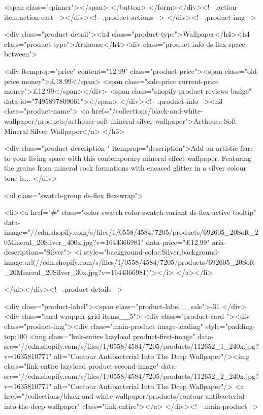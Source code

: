 {{{{{{{              <span class="spinner"></span>
            </button>
          </form></div><!-- .action-item.action-cart --></div><!-- .product-actions -->
</div><!-- .product-img -->

<div class="product-detail"><h4 class="product-type">Wallpaper</h4><h4 class="product-type">Arthouse</h4><div class="product-info ds-flex space-between">
    
<div itemprop="price" content="12.99" class="product-price"><span class="old-price money">£18.99</span>
    <span class="sale-price current-price money">£12.99</span></div>
    <span class="shopify-product-reviews-badge" data-id="7495897809061"></span>
  </div><!-- .product-info --><h3 class="product-name">
      <a href="/collections/black-and-white-wallpaper/products/arthouse-soft-mineral-silver-wallpaper">Arthouse Soft Mineral Silver Wallpaper</a>
    </h3>
    
<div class="product-description " itemprop="description">Add an artistic flare to your living space with this contemporary mineral effect wallpaper. Featuring the grains from mineral rock formations with encased glitter in a silver colour tone is...
</div>



<ul class="swatch-group ds-flex flex-wrap">
        
<li><a href="#" class="color-swatch color-swatch-variant ds-flex active tooltip" data-image="//cdn.shopify.com/s/files/1/0558/4584/7205/products/692605_20Soft_20Mineral_20Silver_400x.jpg?v=1644366981" data-price="£12.99" aria-description="Silver">
              <i style="background-color:Silver;background-image:url(//cdn.shopify.com/s/files/1/0558/4584/7205/products/692605_20Soft_20Mineral_20Silver_30x.jpg?v=1644366981)"></i>
            </a></li>

      </ul></div><!-- .product-details -->

<div class="product-label"><span class="product-label__sale">-31%
          </div><div class="card-wrapper grid-items__5">
            <div class="product-card "><div class="product-img"><div class="main-product image-loading" style="padding-top:100%
      <img class="link-entire lazyload product-first-image" data-src="//cdn.shopify.com/s/files/1/0558/4584/7205/products/112652_1_240x.jpg?v=1635810771" alt="Contour Antibacterial Into The Deep Wallpaper"/><img class="link-entire lazyload product-second-image" data-src="//cdn.shopify.com/s/files/1/0558/4584/7205/products/112652_2_240x.jpg?v=1635810771" alt="Contour Antibacterial Into The Deep Wallpaper"/>
      <a href="/collections/black-and-white-wallpaper/products/contour-antibacterial-into-the-deep-wallpaper" class="link-entire"></a>
    </div><!-- .main-product -->
  
}}}}}}}
